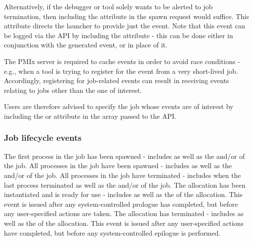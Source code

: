 Alternatively, if the debugger or tool solely wants to be alerted to job
termination, then including the  attribute in
the spawn request would suffice. This attribute directs the launcher to provide
just the  event. Note that this event can be
logged via the  \ac{API} by including the
 attribute - this can be done either in
conjunction with the generated event, or in place of it.

\adviceuserstart
The \ac{PMIx} server is required to cache events in order to avoid race
conditions - e.g., when a tool is trying to register for the
 event from a very short-lived job. Accordingly,
registering for job-related events can result in receiving events relating to
jobs other than the one of interest.

Users are therefore advised to specify the job whose events are of interest by
including the  or
 attribute in the  array passed
to the  \ac{API}.

\adviceuserend

\subsubsection{Job lifecycle events}

\begin{constantdesc}
%
The first process in the job has been spawned - includes  as well as the  and/or  of the job.
%
All processes in the job have been spawned - includes  as well as the  and/or  of the job.
%
All processes in the job have terminated - includes  when the last process terminated as well as the  and/or  of the job.
%
The allocation has been instantiated and is ready for use - includes  as well as the  of the allocation. This event is issued after any system-controlled prologue has completed, but before any user-specified actions are taken.
%
The allocation has terminated - includes  as well as the  of the allocation. This event is issued after any user-specified actions have completed, but before any system-controlled epilogue is performed.
%
\end{constantdesc}

